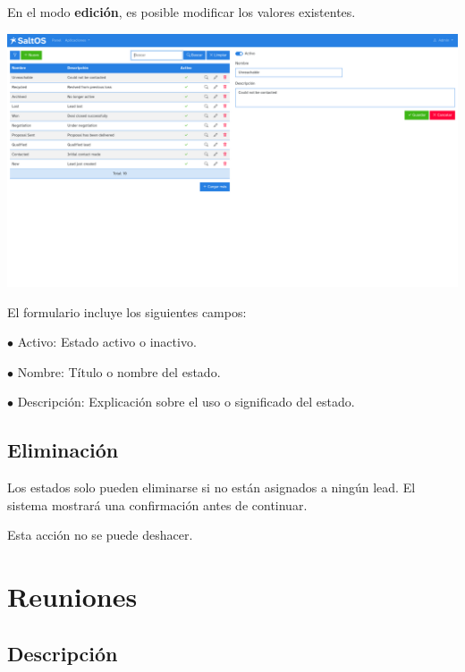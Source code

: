 \documentclass[a4paper]{article}
\begin{document}
En el modo \textbf{edición}, es posible modificar los valores existentes.

\begin{center}\includegraphics[width=1\textwidth]{../ujest/snaps/test-screenshots-js-screenshots-crm-leads-status-edit-10-es-es-1-snap.png}\end{center}

El formulario incluye los siguientes campos:

\begin{compactitem}
\item[\color{myblue}$\bullet$] Activo: Estado activo o inactivo.
\item[\color{myblue}$\bullet$] Nombre: Título o nombre del estado.
\item[\color{myblue}$\bullet$] Descripción: Explicación sobre el uso o significado del estado.
\end{compactitem}

\hypertarget{toc65}{}
\subsection{Eliminación}

Los estados solo pueden eliminarse si no están asignados a ningún lead.
El sistema mostrará una confirmación antes de continuar.

Esta acción no se puede deshacer.


\hypertarget{toc66}{}
\section{Reuniones}

\hypertarget{toc67}{}
\subsection{Descripción}
\end{document}
